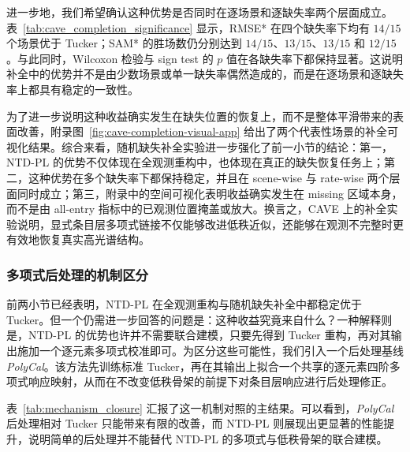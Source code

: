 进一步地，我们希望确认这种优势是否同时在逐场景和逐缺失率两个层面成立。表~\ref{tab:cave_completion_significance} 显示，RMSE* 在四个缺失率下均有 $14/15$ 个场景优于 Tucker；SAM* 的胜场数仍分别达到 $14/15$、$13/15$、$13/15$ 和 $12/15$。与此同时，Wilcoxon 检验与 sign test 的 $p$ 值在各缺失率下都保持显著。这说明补全中的优势并不是由少数场景或单一缺失率偶然造成的，而是在逐场景和逐缺失率上都具有稳定的一致性。

\begin{table}[htbp]
    \centering
    \caption{CAVE 随机缺失补全的场景级对比。各缺失率下统一采用 Tucker $-$ NTD-PL 的差值定义，因此正值表示 NTD-PL 更优。结果表明，补全收益在不同缺失率下都具有显著的场景级一致性。}
    \label{tab:cave_completion_significance}
    \small
    \setlength{\tabcolsep}{5.0pt}
    
\end{table}

为了进一步说明这种收益确实发生在缺失位置的恢复上，而不是整体平滑带来的表面改善，附录图~\ref{fig:cave-completion-visual-app} 给出了两个代表性场景的补全可视化结果。综合来看，随机缺失补全实验进一步强化了前一小节的结论：第一，NTD-PL 的优势不仅体现在全观测重构中，也体现在真正的缺失恢复任务上；第二，这种优势在多个缺失率下都保持稳定，并且在 scene-wise 与 rate-wise 两个层面同时成立；第三，附录中的空间可视化表明收益确实发生在 missing 区域本身，而不是由 all-entry 指标中的已观测位置掩盖或放大。换言之，CAVE 上的补全实验说明，显式条目层多项式链接不仅能够改进低秩近似，还能够在观测不完整时更有效地恢复真实高光谱结构。

\subsubsection{多项式后处理的机制区分}

前两小节已经表明，NTD-PL 在全观测重构与随机缺失补全中都稳定优于 Tucker。但一个仍需进一步回答的问题是：这种收益究竟来自什么？一种解释则是，NTD-PL 的优势也许并不需要联合建模，只要先得到 Tucker 重构，再对其输出施加一个逐元素多项式校准即可。为区分这些可能性，我们引入一个后处理基线 \emph{PolyCal}。该方法先训练标准 Tucker，再在其输出上拟合一个共享的逐元素四阶多项式响应映射，从而在不改变低秩骨架的前提下对条目层响应进行后处理修正。

表~\ref{tab:mechanism_closure} 汇报了这一机制对照的主结果。可以看到，\emph{PolyCal} 后处理相对 Tucker 只能带来有限的改善，而 NTD-PL 则展现出更显著的性能提升，说明简单的后处理并不能替代 NTD-PL 的多项式与低秩骨架的联合建模。

\begin{table}[htbp]
    \centering
    \caption{机制对照主表。三种方法在全观测重构与 $\rho=0.5$ 的随机缺失补全上进行比较。PolyCal 在 Tucker 输出后施加共享逐元素多项式校准，而 NTD-PL 则将非线性链接与低秩骨架联合建模。}
    \label{tab:mechanism_closure}
    \small
    \setlength{\tabcolsep}{4.8pt}
    
\end{table}

